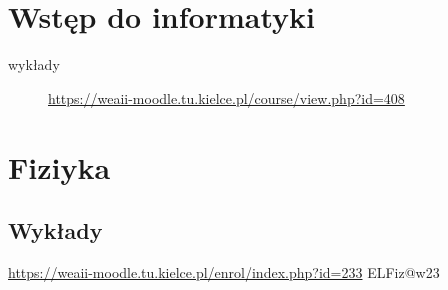\documentclass[11pt]{article}
\begin{document}
\section{Wstęp do informatyki}
\label{sec:orgf06e885}
\begin{description}
\item[{wykłady}] \url{https://weaii-moodle.tu.kielce.pl/course/view.php?id=408}
\end{description}
\section{Fiziyka}
\label{sec:org5b554cb}
\subsection{Wykłady}
\label{sec:org371363f}
\url{https://weaii-moodle.tu.kielce.pl/enrol/index.php?id=233}
ELFiz@w23
\end{document}

